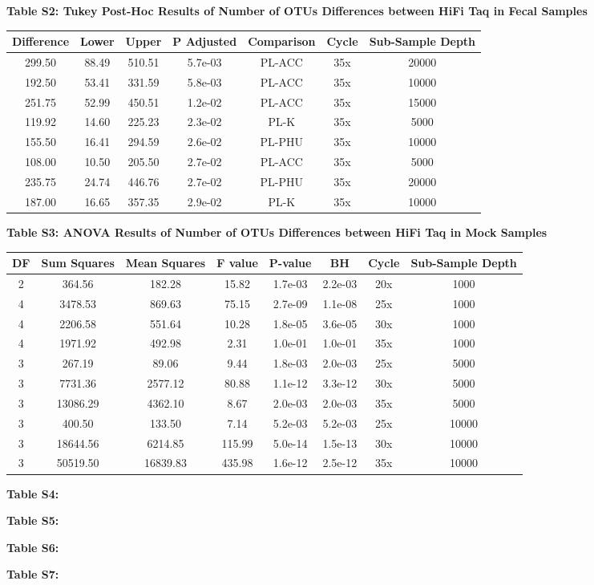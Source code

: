 \documentclass[12pt,]{article}
\begin{document}
\newpage

\textbf{Table S2: Tukey Post-Hoc Results of Number of OTUs Differences
between HiFi Taq in Fecal Samples}

\begin{longtable}[]{@{}ccccccc@{}}
\toprule
Difference & Lower & Upper & P Adjusted & Comparison & Cycle &
Sub-Sample Depth\tabularnewline
\midrule
\endhead
299.50 & 88.49 & 510.51 & 5.7e-03 & PL-ACC & 35x & 20000\tabularnewline
192.50 & 53.41 & 331.59 & 5.8e-03 & PL-ACC & 35x & 10000\tabularnewline
251.75 & 52.99 & 450.51 & 1.2e-02 & PL-ACC & 35x & 15000\tabularnewline
119.92 & 14.60 & 225.23 & 2.3e-02 & PL-K & 35x & 5000\tabularnewline
155.50 & 16.41 & 294.59 & 2.6e-02 & PL-PHU & 35x & 10000\tabularnewline
108.00 & 10.50 & 205.50 & 2.7e-02 & PL-ACC & 35x & 5000\tabularnewline
235.75 & 24.74 & 446.76 & 2.7e-02 & PL-PHU & 35x & 20000\tabularnewline
187.00 & 16.65 & 357.35 & 2.9e-02 & PL-K & 35x & 10000\tabularnewline
\bottomrule
\end{longtable}

\newpage

\textbf{Table S3: ANOVA Results of Number of OTUs Differences between
HiFi Taq in Mock Samples}

\begin{longtable}[]{@{}cccccccc@{}}
\toprule
DF & Sum Squares & Mean Squares & F value & P-value & BH & Cycle &
Sub-Sample Depth\tabularnewline
\midrule
\endhead
2 & 364.56 & 182.28 & 15.82 & 1.7e-03 & 2.2e-03 & 20x &
1000\tabularnewline
4 & 3478.53 & 869.63 & 75.15 & 2.7e-09 & 1.1e-08 & 25x &
1000\tabularnewline
4 & 2206.58 & 551.64 & 10.28 & 1.8e-05 & 3.6e-05 & 30x &
1000\tabularnewline
4 & 1971.92 & 492.98 & 2.31 & 1.0e-01 & 1.0e-01 & 35x &
1000\tabularnewline
3 & 267.19 & 89.06 & 9.44 & 1.8e-03 & 2.0e-03 & 25x &
5000\tabularnewline
3 & 7731.36 & 2577.12 & 80.88 & 1.1e-12 & 3.3e-12 & 30x &
5000\tabularnewline
3 & 13086.29 & 4362.10 & 8.67 & 2.0e-03 & 2.0e-03 & 35x &
5000\tabularnewline
3 & 400.50 & 133.50 & 7.14 & 5.2e-03 & 5.2e-03 & 25x &
10000\tabularnewline
3 & 18644.56 & 6214.85 & 115.99 & 5.0e-14 & 1.5e-13 & 30x &
10000\tabularnewline
3 & 50519.50 & 16839.83 & 435.98 & 1.6e-12 & 2.5e-12 & 35x &
10000\tabularnewline
\bottomrule
\end{longtable}

\newpage

\textbf{Table S4: }

\newpage

\textbf{Table S5: }

\newpage

\textbf{Table S6: }

\newpage

\textbf{Table S7: }
\end{document}
